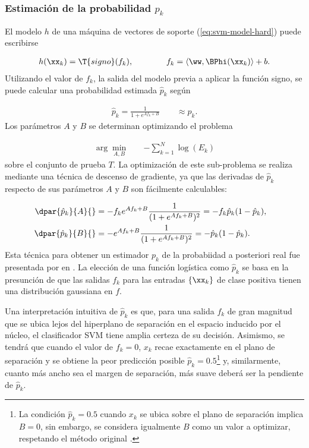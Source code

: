 \subsubsection{Estimación de la probabilidad ${p}_k$}
El modelo $h$ de una máquina de vectores de soporte
(\autoref{eq:svm-model-hard}) puede escribirse

\begin{align*}
  h(\xx_k) = \T{signo}(f_k), \qquad\qquad
  f_k=\langle\ww,\BPhi(\xx_k)\rangle+b.
\end{align*}
Utilizando el valor de $f_k$, la salida del modelo
previa a aplicar la función signo, se puede calcular una probabilidad
estimada $\hat{p}_k$ según

\begin{align}
  \hat{p}_k=\frac{1}{1+e^{Af_k+B}} \qquad \approx p_k.
\end{align}
Los parámetros $A$ y $B$ se determinan optimizando el problema

\begin{align}
  \arg\min_{A,B} \quad & -\sum_{k=1}^{N} \log(E_k)
  \label{abproblem}
\end{align}
sobre el conjunto de prueba $T$. La optimización de este sub-problema
se realiza mediante una técnica de descenso de gradiente, ya que las
derivadas de $\hat{p}_k$ respecto de sus parámetros $A$ y $B$ son
fácilmente calculables:

\begin{align*}
  \dpar{\hat{p}_k}{A}{}&=-f_k e^{Af_k+B}\frac{1}{(1+e^{Af_k+B})^2}
  =-f_k\hat{p}_k(1-\hat{p}_k),&\\
  \dpar{\hat{p}_k}{B}{}&=    -e^{Af_k+B}\frac{1}{(1+e^{Af_k+B})^2}
  =-   \hat{p}_k(1-\hat{p}_k).
\end{align*}
Esta técnica para obtener un estimador $p_k$ de la probabiidad a
posteriori real fue presentada por \citeauthor{platt} en \cite{platt}.
La elección de una función logística como $\hat{p}_k$ se basa en la
presunción de que las salidas $f_k$ para las entradas $\{\xx_k\}$ de
clase positiva tienen una distribución gaussiana en $f$.

Una interpretación intuitiva de $\hat{p}_k$ es que, para una salida
$f_k$ de gran magnitud que se ubica lejos del hiperplano de separación
en el espacio inducido por el núcleo, el clasificador SVM tiene amplia
certeza de su decisión.  Asimismo, se tendrá que cuando el valor de
$f_k=0$, $x_k$ recae exactamente en el plano de separación y se
obtiene la peor predicción posible $\hat{p}_k=0.5$\footnote{La
  condición $\hat{p}_k=0.5$ cuando $x_k$ se ubica sobre el plano de
  separación implica $B=0$, sin embargo, se considera igualmente $B$
  como un valor a optimizar, respetando el método original
  \cite{platt}.} y, similarmente, cuanto más ancho sea el margen de
separación, más suave deberá ser la pendiente de $\hat{p}_k$.

